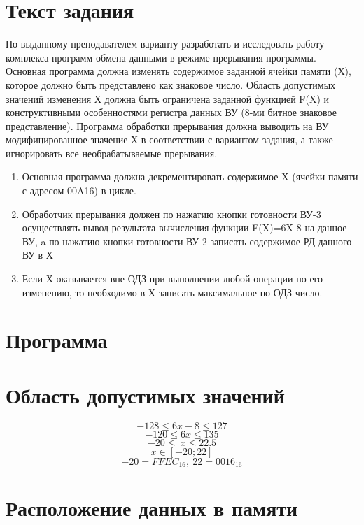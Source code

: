 \documentclass{article}
\begin{document}
\itmo[
  variant=8912,
  labn=6,
  discipline=Основы профессиональной деятельности,
  group=P3115,
  student=Владимир Мацюк,
  teacher=Абузов Ярослав Александрович,
  logo=../../lib/img/itmo.png
]


\section{Текст задания}
По выданному преподавателем варианту разработать и исследовать работу комплекса программ обмена данными в режиме прерывания программы. Основная программа должна изменять содержимое заданной ячейки памяти (Х), которое должно быть представлено как знаковое число. Область допустимых значений изменения Х должна быть ограничена заданной функцией F(X) и конструктивными особенностями регистра данных ВУ (8-ми битное знаковое представление). Программа обработки прерывания должна выводить на ВУ модифицированное значение Х в соответствии с вариантом задания, а также игнорировать все необрабатываемые прерывания.


\begin{enumerate}
  \item Основная программа должна декрементировать содержимое X (ячейки памяти с адресом 00A16) в цикле.
  \item Обработчик прерывания должен по нажатию кнопки готовности ВУ-3 осуществлять вывод результата вычисления функции F(X)=6X-8 на данное ВУ, a по нажатию кнопки готовности ВУ-2 записать содержимое РД данного ВУ в Х
  \item Если Х оказывается вне ОДЗ при выполнении любой операции по его изменению, то необходимо в Х записать максимальное по ОДЗ число.
\end{enumerate}

\section{Программа}



\section{Область допустимых значений}

$$-128 \le 6x-8 \le 127$$
$$-120 \le 6x \le 135 $$
$$-20 \le\ x \le 22.5 $$
$$x \in [-20; 22]$$
$$-20=FFEC_{16},\ 22=0016_{16}$$


\section{Расположение данных в памяти}
\end{document}
